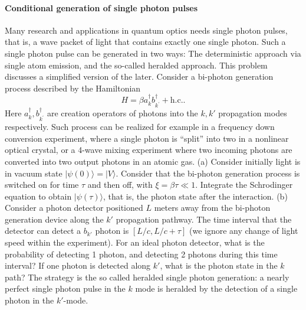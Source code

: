 \documentclass[hyperref, a4paper]{article}
\begin{document}
\paragraph{Conditional generation of single photon pulses} Many research and applications in quantum optics needs single photon pulses, that is, a wave packet of light that contains exactly one single photon. Such a single photon pulse can be generated in two ways: The deterministic approach via single atom emission, and the so-called heralded approach. This problem discusses a simplified version of the later.
Consider a bi-photon generation process described by the Hamiltonian  
\begin{equation}
    H=\beta a_{k}^\dagger b_{k^{\prime}}^\dagger+ \text{h.c.}.
\end{equation}
Here $a_{k}^\dagger, b_{k^{\prime}}^\dagger$ are creation operators of photons into the $k, k'$ propagation modes respectively. Such process can be realized for example in a frequency down conversion experiment, where a single photon is ``split'' into two in a nonlinear optical crystal, or a 4-wave mixing experiment where two incoming photons are converted into two output photons in an atomic gas.
(a) Consider initially light is in vacuum state $|\psi(0)\rangle=|V\rangle$. Consider that the bi-photon generation process is switched on for time $\tau$ and then off, with $\xi=\beta \tau \ll 1$. Integrate the Schrodinger equation to obtain $|\psi(\tau)\rangle$, that is, the photon state after the interaction. (b) Consider a photon detector positioned $L$ meters away from the bi-photon generation device along the $k'$ propagation pathway. The time interval that the detector can detect a $b_{k'}$ photon is $[L / c, L / c+\tau]$ (we ignore any change of light speed within the experiment). For an ideal photon detector, what is the probability of detecting 1 photon, and detecting 2 photons during this time interval? If one photon is detected along $k'$, what is the photon state in the $k$ path? The strategy is the so called heralded single photon generation: a nearly perfect single photon pulse in the $k$ mode is heralded by the detection of a single photon in the $k'$-mode.
\end{document}
